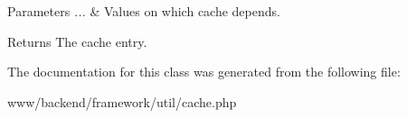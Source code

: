 \begin{DoxyParams}{Parameters}
{\em ...} & Values on which cache depends.\\
\hline
\end{DoxyParams}
\begin{DoxyReturn}{Returns}
The cache entry. 
\end{DoxyReturn}


The documentation for this class was generated from the following file:\begin{DoxyCompactItemize}
\item 
www/backend/framework/util/cache.php\end{DoxyCompactItemize}
